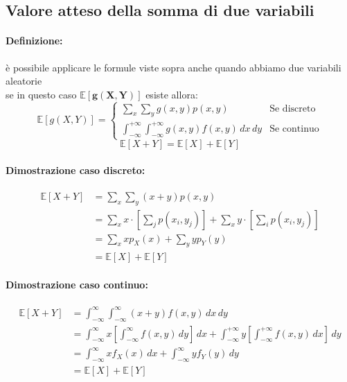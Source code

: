 \documentclass[]{article}
\newcommand{\ev}{\mathbb{E}[X]}
\renewcommand{\ev}[1]{\mathbb{E}[#1]}
\newcommand{\definizione}{\paragraph{Definizione:}}
\begin{document}
    \subsection{Valore atteso della somma di due variabili}
    \definizione è possibile applicare le formule viste sopra anche quando abbiamo due variabili aleatorie \\
    \linebreak[4]
    se in questo caso $\boldsymbol{\ev{g(X,Y)}}$ esiste allora: \\
    \begin{equation*}
        \ev{g(X,Y)} =
        \begin{cases}
            \sum_{x}^{} \sum_{y}^{} g(x,y) p(x,y) & \text{Se discreto} \\
            \int_{-\infty}^{+\infty} \int_{-\infty}^{+\infty} g(x,y) f(x,y) \, dx \, dy & \text{Se continuo}
        \end{cases}
    \end{equation*}
    \linebreak[4]
    \[ \ev{X + Y} = \ev{X} + \ev{Y} \]
    \paragraph{Dimostrazione caso discreto:}
    \begin{equation*}
        \begin{split}
            \ev{X + Y} &= \sum_{x}^{} \sum_{y}^{} (x + y) p(x, y) \\
            & = \sum_{x}^{} x \cdot [\sum_{j}^{} p(x_i, y_j)] + \sum_{x}^{} y \cdot [\sum_{i}^{} p(x_i, y_j)] \\
            & = \sum_{x}^{} xp_X(x) + \sum_{y}^{} yp_Y(y) \\
            & = \ev{X} + \ev{Y}
        \end{split}
    \end{equation*}
    \paragraph{Dimostrazione caso continuo:}
    \begin{equation*}
        \begin{split}
            \ev{X + Y} &= \int_{-\infty}^{\infty} \int_{-\infty}^{\infty} (x + y) f(x, y) \, dx \, dy \\
            & = \int_{-\infty}^{\infty} x [\int_{-\infty}^{\infty} f(x,y) \, dy] \, dx + \int_{-\infty}^{+\infty} y [ \int_{-\infty}^{+\infty} f(x,y) \, dx ] \, dy \\
            & = \int_{-\infty}^{\infty} x f_X(x) \, dx + \int_{-\infty}^{\infty} yf_Y(y) \, dy \\
            & = \ev{X} + \ev{Y}
        \end{split}
    \end{equation*}
\end{document}
